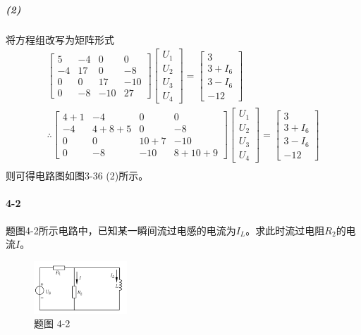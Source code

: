 \documentclass[hyperref, UTF8]{ctexart}
\begin{document}
\subparagraph{(2)}将方程组改写为矩阵形式
\begin{gather*}
    \left[ \begin{matrix}
    5 & -4 & 0 & 0 \\ -4 & 17 & 0 & -8 \\ 0 & 0 & 17 & -10 \\ 0 & -8 & -10 & 27
    \end{matrix} \right]
    \left[ \begin{matrix}
    U_1 \\ U_2 \\ U_3 \\ U_4
    \end{matrix} \right]
    =
    \left[ \begin{matrix}
    3 \\ 3+I_6 \\ 3-I_6 \\ -12
    \end{matrix} \right] \\
    \therefore
    \left[ \begin{matrix}
    4+1 & -4 & 0 & 0 \\ -4 & 4+8+5 & 0 & -8 \\ 0 & 0 & 10+7 & -10 \\ 0 & -8 & -10 & 8+10+9
    \end{matrix} \right]
    \left[ \begin{matrix}
    U_1 \\ U_2 \\ U_3 \\ U_4
    \end{matrix} \right]
    =
    \left[ \begin{matrix}
    3 \\ 3+I_6 \\ 3-I_6 \\ -12
    \end{matrix} \right] \\
\end{gather*}
则可得电路图如图3-36 (2)所示。

\paragraph{4-2}\label{4-2}
题图4-2所示电路中，已知某一瞬间流过电感的电流为$I_L$。求此时流过电阻$R_2$的电流$I$。

\begin{figure}[!htb]
\centering
\includegraphics[width=0.312\textwidth]{p4-2.png}
\caption*{题图 4-2}
\end{figure}
\end{document}
